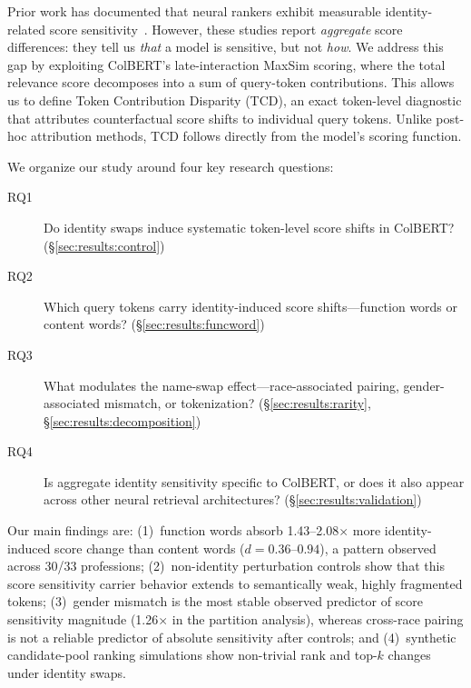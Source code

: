 \documentclass[11pt]{article}
\begin{document}
Prior work has documented that neural rankers exhibit measurable identity-related score sensitivity~\citep{rekabsaz2021, ziems2024, manchanda2025}. However, these studies report \emph{aggregate} score differences: they tell us \emph{that} a model is sensitive, but not \emph{how}. We address this gap by exploiting ColBERT’s late-interaction MaxSim scoring, where the total relevance score decomposes into a sum of query-token contributions. This allows us to define Token Contribution Disparity (TCD), an exact token-level diagnostic that attributes counterfactual score shifts to individual query tokens. Unlike post-hoc attribution methods, TCD follows directly from the model’s scoring function.

We organize our study around four key research questions:
\begin{description}
\item[RQ1] Do identity swaps induce systematic token-level score shifts in ColBERT? (\S\ref{sec:results:control})
\item[RQ2] Which query tokens carry identity-induced score shifts---function words or content words? (\S\ref{sec:results:funcword})
\item[RQ3] What modulates the name-swap effect---race-associated pairing, gender-associated mismatch, or tokenization? (\S\ref{sec:results:rarity}, \S\ref{sec:results:decomposition})
\item[RQ4] Is aggregate identity sensitivity specific to ColBERT, or does it also appear across other neural retrieval architectures? (\S\ref{sec:results:validation})
\end{description}

Our main findings are: (1)~function words absorb 1.43--2.08$\times$ more identity-induced score change than content words ($d = 0.36$--$0.94$), a pattern observed across 30/33 professions; (2)~non-identity perturbation controls show that this score sensitivity carrier behavior extends to semantically weak, highly fragmented tokens; (3)~gender mismatch is the most stable observed predictor of score sensitivity magnitude (1.26$\times$ in the partition analysis), whereas cross-race pairing is not a reliable predictor of absolute sensitivity after controls; and (4)~synthetic candidate-pool ranking simulations show non-trivial rank and top-$k$ changes under identity swaps.
\end{document}
